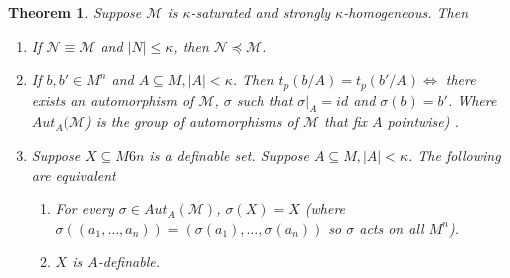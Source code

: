 \documentclass[letterpaper, 12pt]{article}
\newcommand{\cM}{\mathcal{M}}
\newcommand{\cN}{\mathcal{N}}
\theoremstyle{stdthm}
\newtheorem{thm}{Theorem}[section]
\theoremstyle{stddef}
\theoremstyle{stdnonum}
\theoremstyle{stdqands}
\theoremstyle{stdbold}
\begin{document}
\begin{thm}
Suppose $\cM$ is $\kappa$-saturated and strongly $\kappa$-homogeneous. Then 
\begin{enumerate}
\item If $\cN \equiv \cM$ and $|N| \leq \kappa$, then $\cN \preceq \cM$. 
\item If $b,b' \in M^n$ and $A \subseteq M, |A| < \kappa$. Then $t_p(b/A) = t_p(b'/A) \Leftrightarrow$ there exists an automorphism of $\cM$, $\sigma$ such that $\sigma|_A = id$ and $\sigma(b) = b'$.  Where $Aut_A(\cM$) is the group of automorphisms of $\cM$ that fix $A$ pointwise) . 
\item Suppose $X \subseteq M6n$ is a definable set. Suppose $A \subseteq M, |A| < \kappa$. The following are equivalent
\begin{enumerate}
\item For every $\sigma \in Aut_A(\cM)$, $\sigma(X) = X$ (where $\sigma((a_1,\dots, a_n)) = (\sigma(a_1), \dots, \sigma(a_n))$ so $\sigma$ acts on all $M^n$). 
\item $X$ is $A$-definable. 
\end{enumerate}

\end{enumerate}
\end{thm}
\end{document}
